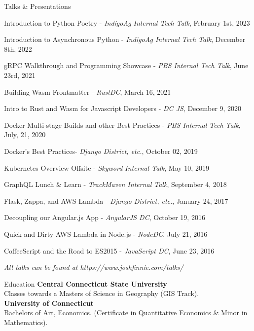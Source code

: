 \documentclass{bluefin_cv}
\begin{document}
\begin{bfcvSection}{Talks \& Presentations}
\begin{bfcvListSubsection}
\item Introduction to Python Poetry - \textsl{IndigoAg Internal Tech Talk}, February 1st, 2023
\item Introduction to Asynchronous Python - \textsl{IndigoAg Internal Tech Talk}, December 8th, 2022
\item gRPC Walkthrough and Programming Showcase - \textsl{PBS Internal Tech Talk}, June 23rd, 2021
\item Building Wasm-Frontmatter - \textsl{RustDC}, March 16, 2021
\item Intro to Rust and Wasm for Javascript Developers - \textsl{DC JS}, December 9, 2020
\item Docker Multi-stage Builds and other Best Practices - \textsl{PBS Internal Tech Talk}, July, 21, 2020
\item Docker's Best Practices- \textsl{Django District, etc.}, October 02, 2019
\item Kubernetes Overview Offsite - \textsl{Skyword Internal Talk}, May 10, 2019
\item GraphQL Lunch \& Learn - \textsl{TrackMaven Internal Talk}, September 4, 2018
\item Flask, Zappa, and AWS Lambda - \textsl{Django District, etc.}, January 24, 2017
\item Decoupling our Angular.js App - \textsl{AngularJS DC}, October 19, 2016
\item Quick and Dirty AWS Lambda in Node.js - \textsl{NodeDC}, July 21, 2016
\item CoffeeScript and the Road to ES2015 - \textsl{JavaScript DC}, June 23, 2016
\end{bfcvListSubsection}
\smallskip
\centerline{\textsl{All talks can be found at https://www.joshfinnie.com/talks/}}
\end{bfcvSection}

\begin{bfcvSection}{Education}
{\bf Central Connecticut State University}
\\ Classes towards a Masters of Science in Geography (GIS Track).\hfill\\
{\bf University of Connecticut}
\\ Bachelors of Art, Economics. (Certificate in Quantitative Economics \& Minor in Mathematics).\hfill\\
\end{bfcvSection}

\end{document}
